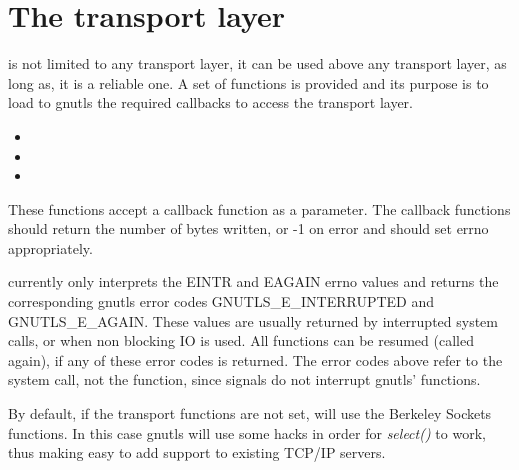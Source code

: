 \section{The transport layer}
\par
\gnutls{} is not limited to any transport layer, it 
can be used above any transport layer, as long as, it is a reliable 
one. A set of functions is provided and its purpose is to load
to gnutls the required callbacks to access the transport layer.

\begin{itemize}
\item {}
\item {}
\item {}
\end{itemize}

These functions accept a callback function as a parameter.
The callback functions should return the number of bytes written, or -1 on 
error and should set errno appropriately.
\par
\gnutls{} currently only interprets the EINTR and EAGAIN errno values and
returns the corresponding gnutls error codes GNUTLS\_E\_INTERRUPTED and
GNUTLS\_E\_AGAIN.
These values are usually returned by interrupted system calls, or 
when non blocking IO is used. All \gnutls{} functions
can be resumed (called again), if any of these error codes is returned.
The error codes above refer to the system call, not the \gnutls{} function,
since signals do not interrupt gnutls' functions.

\par
By default, if the transport functions are not set, \gnutls{} will use
the Berkeley Sockets functions. In this case
gnutls will use some hacks in order for \emph{select()} to work, thus
making easy to add \tls{} support to existing TCP/IP servers.

